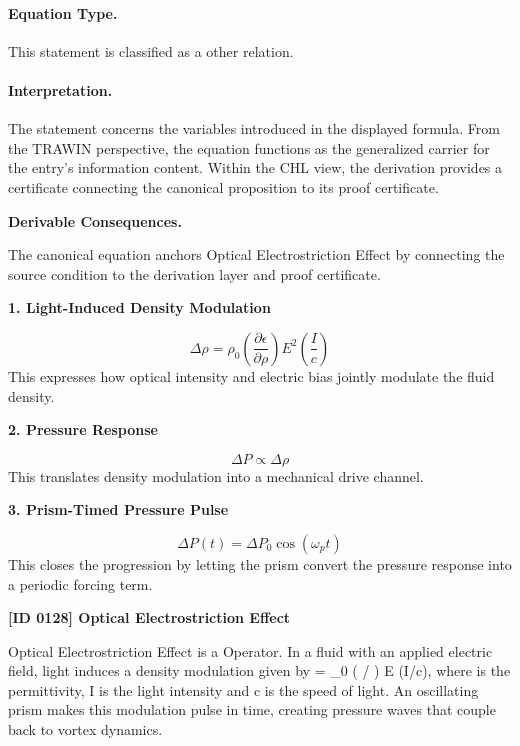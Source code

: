 \paragraph{Equation Type.}
This statement is classified as a other relation.

\paragraph{Interpretation.}
The statement concerns the variables introduced in the displayed formula. From the TRAWIN perspective, the equation functions as the generalized carrier for the entry’s information content. Within the CHL view, the derivation provides a certificate connecting the canonical proposition to its proof certificate.

\par\vspace{0.35em}
\noindent\textbf{Derivable Consequences.}\quad
\begingroup
\footnotesize
\raggedright
The canonical equation anchors Optical Electrostriction Effect by connecting the source condition to the derivation layer and proof certificate.
\par\endgroup

\noindent\textbf{1. Light-Induced Density Modulation}\par
\[
\Delta \rho = \rho_0\left(\frac{\partial \epsilon}{\partial \rho}\right)E^2\left(\frac{I}{c}\right)
\]
\noindent This expresses how optical intensity and electric bias jointly modulate the fluid density.\par
\noindent\textbf{2. Pressure Response}\par
\[
\Delta P \propto \Delta \rho
\]
\noindent This translates density modulation into a mechanical drive channel.\par
\noindent\textbf{3. Prism-Timed Pressure Pulse}\par
\[
\Delta P(t) = \Delta P_0\cos(\omega_p t)
\]
\noindent This closes the progression by letting the prism convert the pressure response into a periodic forcing term.\par

\clearpage
\noindent\textbf{[ID 0128] Optical Electrostriction Effect}\par
\vspace{0.35em}
\begingroup\small
{}
Optical Electrostriction Effect is a Operator. In a fluid with an applied electric field, light induces a density modulation given by    =  \_0 (  /  ) E  (I/c), where   is the permittivity, I is the light intensity and c is the speed of light. An oscillating prism makes this modulation pulse in time, creating pressure waves that couple back to vortex dynamics.

